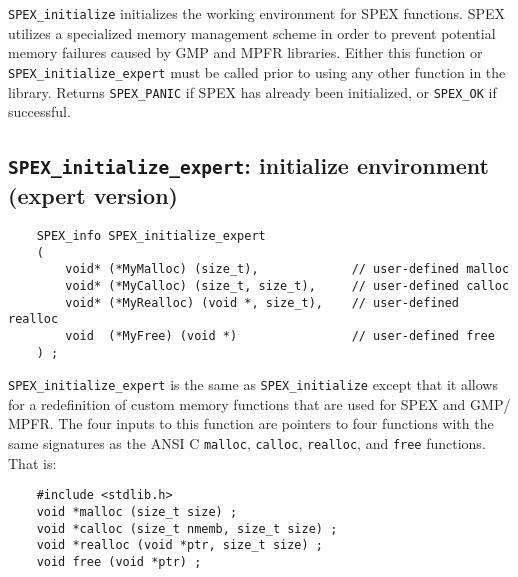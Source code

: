 \documentclass[12pt,oneside]{book}
\theoremstyle{definition}
\begin{document}
\verb|SPEX_initialize| initializes the working environment for SPEX
functions.  SPEX utilizes a specialized memory management scheme in order to
prevent potential memory failures caused by GMP and MPFR libraries.  Either
this function or \verb|SPEX_initialize_expert| must be called prior to using
any other function in the library.  Returns \verb|SPEX_PANIC| if SPEX has
already been initialized, or \verb|SPEX_OK| if successful.


\subsection{\texttt{SPEX\_initialize\_expert}: initialize environment (expert version)} \label{ss:SPEX_initialize_expert}
\begin{mdframed}[userdefinedwidth=\textwidth]
{\footnotesize
\begin{verbatim}
    SPEX_info SPEX_initialize_expert
    (
        void* (*MyMalloc) (size_t),             // user-defined malloc
        void* (*MyCalloc) (size_t, size_t),     // user-defined calloc
        void* (*MyRealloc) (void *, size_t),    // user-defined realloc
        void  (*MyFree) (void *)                // user-defined free
    ) ;
\end{verbatim}
} \end{mdframed}

\verb|SPEX_initialize_expert| is the same as \verb|SPEX_initialize| except that
it allows for a redefinition of custom memory functions that are used for SPEX
and GMP/ MPFR.  The four inputs to this function are pointers to four
functions with the same signatures as the ANSI C \verb'malloc', \verb'calloc',
\verb'realloc', and \verb'free' functions.  That is:

\begin{mdframed}[userdefinedwidth=\textwidth]
{\footnotesize
\begin{verbatim}
    #include <stdlib.h>
    void *malloc (size_t size) ;
    void *calloc (size_t nmemb, size_t size) ;
    void *realloc (void *ptr, size_t size) ;
    void free (void *ptr) ;
\end{verbatim}
} \end{mdframed}
\end{document}
